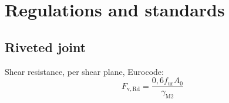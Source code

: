 
\section{Regulations and standards}

\subsection{Riveted joint}

Shear resistance, per shear plane, Eurocode:
\begin{equation}
F_{\mathrm{v}, \mathrm{Rd}}=\frac{0,6 f_{\mathrm{ur}} A_0}{\gamma_{\mathrm{M} 2}}
\end{equation}